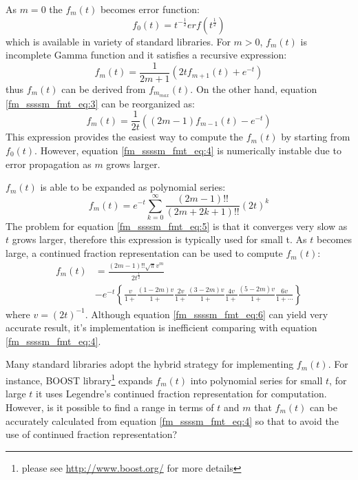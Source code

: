 As $m=0$ the $f_{m}(t)$ becomes error function:
\begin{equation}
 f_{0}(t) = t^{-\frac{1}{2}} erf(t^{\frac{1}{2}})
\label{fm_ssssm_fmt_eq:2}
\end{equation}
which is available in variety of standard libraries. For $m>0$, $f_{m}(t)$
is incomplete Gamma function and it satisfies a recursive expression:
\begin{equation}
  f_{m}(t) = \frac{1}{2m+1}\left( 2tf_{m+1}(t) + e^{-t}\right)  
 \label{fm_ssssm_fmt_eq:3}
\end{equation}
thus $f_{m}(t)$ can be derived from $f_{m_{max}}(t)$. On the other hand, equation
\ref{fm_ssssm_fmt_eq:3} can be reorganized as:
\begin{equation}
  f_{m}(t) = \frac{1}{2t}\left( (2m-1)f_{m-1}(t) - e^{-t}\right)    
 \label{fm_ssssm_fmt_eq:4}
\end{equation}
This expression provides the easiest way to compute the $f_{m}(t)$ by starting from 
$f_{0}(t)$. However, equation \ref{fm_ssssm_fmt_eq:4} is numerically instable due to
error propagation as $m$ grows larger.

$f_{m}(t)$ is able to be expanded as polynomial series:
\begin{equation}
 \label{fm_ssssm_fmt_eq:5}
 f_{m}(t) = e^{-t}\sum_{k=0}^{\infty}\frac{(2m-1)!!}{(2m+2k+1)!!}
 (2t)^{k}
\end{equation}
The problem for equation \ref{fm_ssssm_fmt_eq:5} is that it converges very slow as $t$
grows larger, therefore this expression is typically used for small t. As $t$ becomes large,
a continued fraction representation can be used to compute $f_{m}(t)$\cite{harris1983sssm}:
\begin{equation}
\begin{split}
f_{m}(t) &= \frac{(2m-1)!!\sqrt{\pi}v^{m}}{2t^{\frac{1}{2}}} \\
         &- e^{-t}
         \left\lbrace 
         \frac{v}{1+}\frac{(1-2m)v}{1+}\frac{2v}{1+}\frac{(3-2m)v}{1+}\frac{4v}{1+}
         \frac{(5-2m)v}{1+}\frac{6v}{1+\cdots}
         \right\rbrace 
\end{split}
\label{fm_ssssm_fmt_eq:6}
\end{equation}
where $v = (2t)^{-1}$. Although equation \ref{fm_ssssm_fmt_eq:6} can yield very accurate
result, it's implementation is inefficient comparing with equation \ref{fm_ssssm_fmt_eq:4}.

Many standard libraries adopt the hybrid strategy for implementing $f_{m}(t)$. For instance,
BOOST library\footnote{please see \url{http://www.boost.org/} for more details} expands 
$f_{m}(t)$ into polynomial series for small $t$, for large $t$ it uses
Legendre's continued fraction representation for computation. However, is it possible 
to find a range in terms of $t$ and $m$ that $f_{m}(t)$ can be accurately calculated from
equation \ref{fm_ssssm_fmt_eq:4} so that to avoid the use of continued fraction representation?

